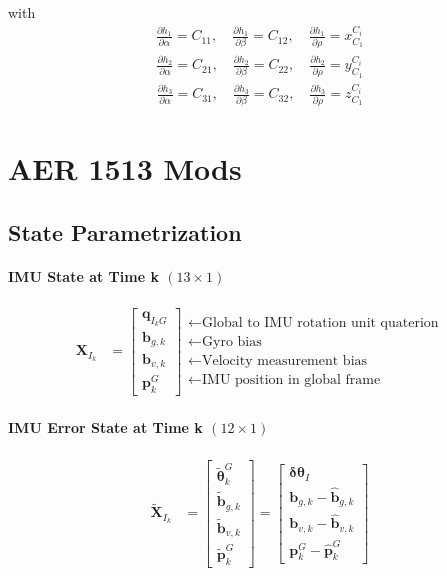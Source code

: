 \documentclass[10pt,letterpaper,fleqn,oneside]{article}
\newcommand{\nl}{\\[0.5em]}
\def\Vec#1{\mathbf{#1}} %
\newcommand{\bbm}{\begin{bmatrix}}
\newcommand{\ebm}{\end{bmatrix}}
\begin{document}
with
\begin{align}
\frac{\partial h_1}{\partial \alpha} = C_{11}, \quad \frac{\partial h_1}{\partial \beta} = C_{12}, \quad \frac{\partial h_1}{\partial \rho} = x^{C_i}_{C_1}\end{align}
\begin{align*}
\frac{\partial h_2}{\partial \alpha} = C_{21}, \quad \frac{\partial h_2}{\partial \beta} = C_{22}, \quad \frac{\partial h_2}{\partial \rho} = y^{C_i}_{C_1}\end{align*}
\begin{align*}
\frac{\partial h_3}{\partial \alpha} = C_{31}, \quad \frac{\partial h_3}{\partial \beta} = C_{32}, \quad \frac{\partial h_3}{\partial \rho} = z^{C_i}_{C_1}\end{align*}













\section{AER 1513 Mods}

\subsection{State Parametrization}
\paragraph{IMU State at Time k $(13\times1)$}
\begin{align}
\Vec{X}_{I_k} &= \bbm \Vec{q}_{I_k G} \nl
								\Vec{b}_{g,k} \nl
								\Vec{b}_{v,k} \nl
								\Vec{p}^G_k 
						 \ebm 
						 \begin{array}{l}
						 \leftarrow \text{Global to IMU rotation unit quaterion} \nl
						 \leftarrow \text{Gyro bias} \nl
						 \leftarrow \text{Velocity measurement bias} \nl
						 \leftarrow \text{IMU position in global frame} 
						 \end{array}						 
\end{align}

\paragraph{IMU Error State at Time k $(12\times1)$}
\begin{align}
\widetilde{\Vec{X}}_{I_k} &= 	\bbm \widetilde{\boldsymbol{\theta}}^G_k \nl
										\widetilde{\Vec{b}}_{g,k} \nl
										\widetilde{\Vec{b}}_{v,k} \nl
										\widetilde{\Vec{p}}^G_k
								\ebm
								=
								\bbm
										\boldsymbol{\delta\theta}_I \nl
										\Vec{b}_{g,k} - \hat{\Vec{b}}_{g,k} \nl
										\Vec{b}_{v,k} - \hat{\Vec{b}}_{v,k} \nl
										\Vec{p}^G_k - \hat{\Vec{p}}^G_k 
								\ebm
\end{align}
\end{document}

